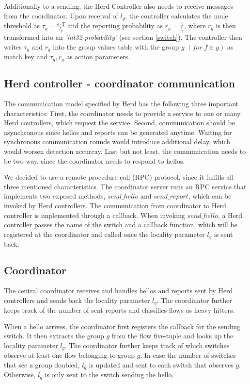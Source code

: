 \documentclass[11pt,oneside,a4paper]{article}
\begin{document}
\noindent Additionally to a sending, the Herd Controller also needs to receive messages from the coordinator. Upon receival of $l_g$, the controller calculates the mule threshold as $\tau_g = \frac{\epsilon \cdot T}{l_g}$ and the reporting probability as $r_g = \frac{1}{l_g}$, where $r_g$ is then transformed into an \textit{'int32-probability'} (see section \ref{switch}). The controller then writes $\tau_g$ and $r_g$ into the group values table with the group $g$ $(for \; f \in g)$ as match key and $\tau_g, r_g$ as action parameters.


\subsection{Herd controller - coordinator communication} \label{communication}

The communication model specified by Herd has the following three important characteristics: First, the coordinator needs to provide a service to one or many Herd controllers, which request the service. Second, communication should be asynchronous since hellos and reports can be generated anytime. Waiting for synchronous communication rounds would introduce additional delay, which would worsen detection accurcay. Last but not least, the communication needs to be two-way, since the coordinator needs to respond to hellos.

We decided to use a remote procedure call (RPC) protocol, since it fulfills all three mentioned characteristics. The coordinator server runs an RPC service that implements two exposed methods, $send\_hello$ and $send\_report$, which can be invoked by Herd controllers. The communication from coordinator to Herd controller is implemented through a callback. When invoking $send\_hello$, a Herd controller passes the name of the switch and a callback function, which will be registered at the coordinator and called once the locality parameter $l_g$ is sent back.


\subsection{Coordinator} \label{coordinator}
The central coordinator receives and handles hellos and reports sent by Herd controllers and sends back the locality parameter $l_g$. The coordinator further keeps track of the number of sent reports and classifies flows as heavy hitters.

\noindent When a hello arrives, the coordinator first registers the callback for the sending switch. It then extracts the group $g$ from the flow five-tuple and looks up the locality parameter $l_g$. The coordinator further keeps track of which switches observe at least one flow belonging to group $g$. In case the number of switches that see a group doubled, $l_g$ is updated and sent to each switch that observes $g$. Otherwise, $l_g$ is only sent to the switch sending the hello.
\end{document}
